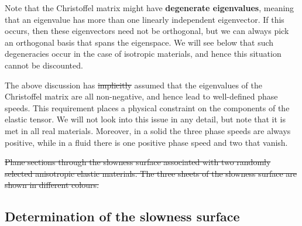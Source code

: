 \documentclass [a4paper,12pt]{paper}
\providecommand{\DIFdel}[1]{{\protect\color{red}\sout{#1}}}                      %
\providecommand{\DIFdelbegin}{} %
\providecommand{\DIFdelend}{} %
\providecommand{\DIFdelFL}[1]{\DIFdel{#1}} %
\begin{document}
Note that the Christoffel matrix might have \textbf{degenerate eigenvalues}, meaning that an eigenvalue has more than one linearly independent eigenvector. If this occurs, then these eigenvectors need not be orthogonal, but we 
can always pick an orthogonal basis that spans the eigenspace. We will see below that such degeneracies occur in the case of isotropic materials, and hence this situation cannot be discounted.

The above discussion has \DIFdelbegin \DIFdel{implicitly }\DIFdelend assumed that the eigenvalues of the Christoffel matrix are all non-negative, and hence lead to well-defined phase speeds. This requirement places a physical constraint on the components of the elastic tensor. 
We will not look into this issue in any detail, but note that it is met in all real materials. Moreover, in a solid the three phase speeds are always positive, while in a fluid there is one positive phase speed and two that vanish.

\DIFdelbegin %
{%
\DIFdelFL{Plane sections through the slowness surface associated with two randomly selected anisotropic elastic materials. The three sheets of the slowness surface are shown in different colours.}}

\DIFdelend \subsection*{Determination of the slowness surface}
\end{document}
